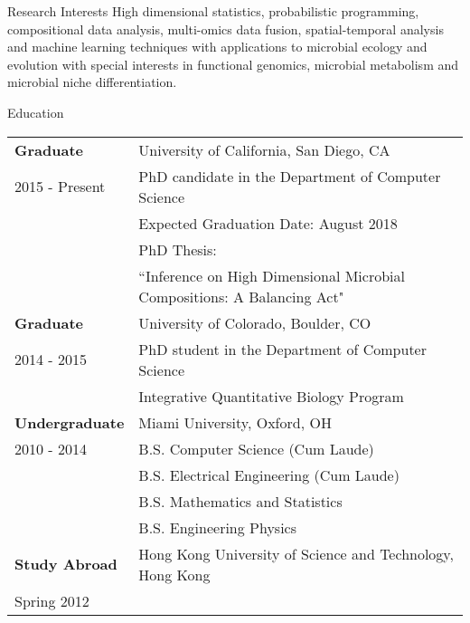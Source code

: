 \documentclass{resume} %
\begin{document}

\begin{rSection}{Research Interests}
  High dimensional statistics, probabilistic programming, compositional data analysis, multi-omics data fusion, spatial-temporal analysis and machine learning techniques with applications to microbial ecology and evolution with special interests in functional genomics, microbial metabolism and microbial niche differentiation.
\end{rSection}
\begin{rSection}{Education}
  \begin{tabular}{ll}
    \textbf{Graduate}      & University of California, San Diego, CA  \\
    2015 - Present  & PhD candidate in the Department of Computer Science \\
                    & Expected Graduation Date: August 2018\\
                    & PhD Thesis: \\
                    & ``Inference on High Dimensional Microbial Compositions: A Balancing Act"\\
    \textbf{Graduate}      & University of Colorado, Boulder, CO \\
    2014 - 2015   & PhD student in the Department of Computer Science \\
                  & Integrative Quantitative Biology Program \\
    \textbf{Undergraduate} & Miami University, Oxford, OH \\
    2010 - 2014   & B.S. Computer Science (Cum Laude)\\
    & B.S. Electrical Engineering (Cum Laude)\\
    & B.S. Mathematics and Statistics \\
    & B.S. Engineering Physics \\
    \textbf{Study Abroad} &  Hong Kong University of Science and Technology, Hong Kong   \\
    Spring 2012 \\
  \end{tabular}
\end{rSection}
\end{document}
